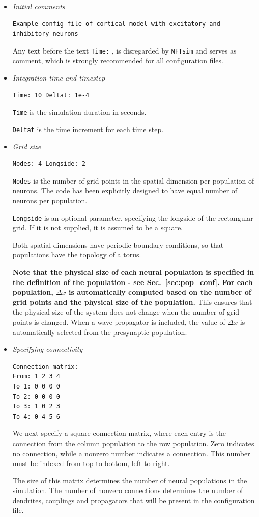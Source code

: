 \documentclass[12pt,a4paper]{article}
\newcommand{\type}[1]{{\small\small\tt #1} }
\newcommand{\NF}[0]{\type{NFTsim}}
\begin{document}
\begin{itemize}
\item {\em Initial comments}
\begin{lstlisting}
Example config file of cortical model with excitatory and inhibitory neurons
\end{lstlisting}
Any text before the text \type{Time:}, is disregarded by \NF and serves as comment, which is strongly recommended for all configuration files.
\item  {\em Integration time and timestep}
\begin{lstlisting}
Time: 10 Deltat: 1e-4
\end{lstlisting}
\type{Time} is the simulation duration in seconds.

\type{Deltat} is the time increment for each time step.
\item  {\em Grid size}
\begin{lstlisting}
Nodes: 4 Longside: 2
\end{lstlisting}
\type{Nodes} is the number of grid points in the spatial dimension per population of neurons. The code has been explicitly designed to have equal number of neurons per population.

\type{Longside} is an optional parameter, specifying the longside of the rectangular grid. If it is not supplied, it is assumed to be a square.

Both spatial dimensions have periodic boundary conditions, so that populations have the topology of a torus.

{\bf Note that the physical size of each neural population is specified in the definition of the population - see Sec.~\ref{sec:pop_conf}. For each population, $\Delta x$ is automatically computed based on the number of grid points and the physical size of the population.} This ensures that the physical size of the system does not change when the number of grid points is changed. When a wave propagator is included, the value of $\Delta x$ is automatically selected from the presynaptic population.

\item {\em Specifying connectivity}
\begin{lstlisting}
Connection matrix:
From: 1 2 3 4
To 1: 0 0 0 0
To 2: 0 0 0 0
To 3: 1 0 2 3
To 4: 0 4 5 6
\end{lstlisting}
We next specify a square connection matrix, where each entry is the connection from the column population to the row population. Zero indicates no connection, while a nonzero number indicates a connection. This number must be indexed from top to bottom, left to right.

The size of this matrix determines the number of neural populations in the simulation. The number of nonzero connections determines the number of dendrites, couplings and propagators that will be present in the configuration file.
\end{itemize}
\end{document}
